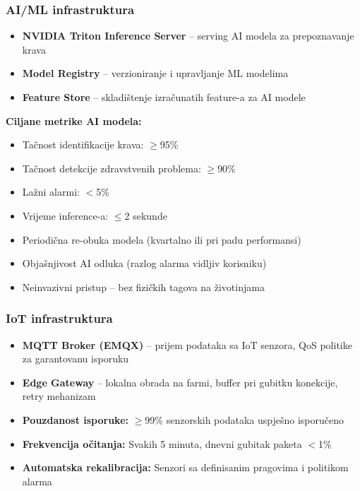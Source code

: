 \documentclass{article}
\begin{document}
\subsubsection{AI/ML infrastruktura}

\begin{itemize}
    \item \textbf{NVIDIA Triton Inference Server} -- serving AI modela za prepoznavanje krava
    \item \textbf{Model Registry} -- verzioniranje i upravljanje ML modelima
    \item \textbf{Feature Store} -- skladištenje izračunatih feature-a za AI modele
\end{itemize}

\textbf{Ciljane metrike AI modela:}
\begin{itemize}
    \item Tačnost identifikacije krava: $\geq$95\%
    \item Tačnost detekcije zdravstvenih problema: $\geq$90\%
    \item Lažni alarmi: $<$5\%
    \item Vrijeme inference-a: $\leq$2 sekunde
    \item Periodična re-obuka modela (kvartalno ili pri padu performansi)
    \item Objašnjivost AI odluka (razlog alarma vidljiv korisniku)
    \item Neinvazivni pristup -- bez fizičkih tagova na životinjama
\end{itemize}

\subsubsection{IoT infrastruktura}

\begin{itemize}
    \item \textbf{MQTT Broker (EMQX)} -- prijem podataka sa IoT senzora, QoS politike za garantovanu isporuku
    \item \textbf{Edge Gateway} -- lokalna obrada na farmi, buffer pri gubitku konekcije, retry mehanizam
    \item \textbf{Pouzdanost isporuke:} $\geq$99\% senzorskih podataka uspješno isporučeno
    \item \textbf{Frekvencija očitanja:} Svakih 5 minuta, dnevni gubitak paketa $<$1\%
    \item \textbf{Automatska rekalibracija:} Senzori sa definisanim pragovima i politikom alarma
\end{itemize}
\end{document}
